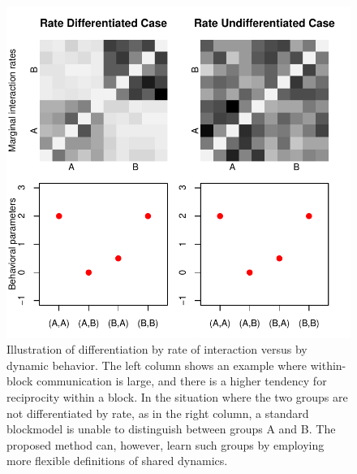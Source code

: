 \begin{figure}
\centering
\includegraphics[scale=.45]{../figs/introexample/all}
\caption{Illustration of differentiation by rate of interaction versus by dynamic behavior.  The left column shows an example where within-block communication is large, and there is a higher tendency for reciprocity within a block.  In the situation where the two groups are not differentiated by rate, as in the right column, a standard blockmodel is unable to distinguish between groups A and B.  The proposed method can, however, learn such groups by employing more flexible definitions of shared dynamics.}
\label{fig:introexample}
\end{figure}
